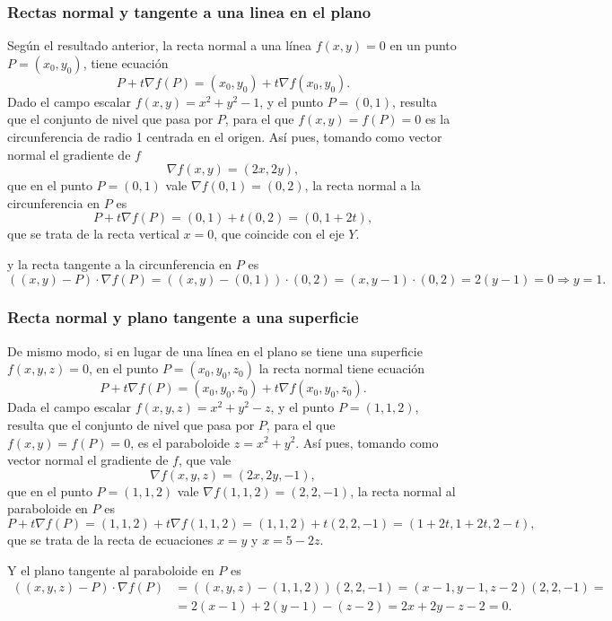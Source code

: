 \begin{frame}
	\frametitle{Rectas normal y tangente a una linea en el plano}
	Según el resultado anterior, la recta normal a una línea $f(x,y)=0$ en un punto $P=(x_0,y_0)$, tiene ecuación
	\[
		P+t\nabla f(P) = (x_0,y_0)+t\nabla f(x_0,y_0).
	\]
	Dado el campo escalar $f(x,y)=x^2+y^2-1$, y el punto $P=(0,1)$, resulta que el conjunto de nivel que pasa por $P$, para el que $f(x,y)=f(P)=0$ es la circunferencia de radio 1 centrada en el origen.
	Así pues, tomando como vector normal el gradiente de $f$
	\[
		\nabla f(x,y) = (2x,2y),
	\] 
	que en el punto $P=(0,1)$ vale $\nabla f(0,1) = (0,2)$, la recta normal a la circunferencia en $P$ es
	\[
		P+t\nabla f(P) = (0,1)+t(0,2) = (0,1+2t),
	\]
	que se trata de la recta vertical $x=0$, que coincide con el eje $Y$.
	
	y la recta tangente a la circunferencia en $P$ es
	\[
		((x,y)-P)\cdot \nabla f(P) = ((x,y)-(0,1))\cdot (0,2) = (x,y-1)\cdot(0,2) = 2(y-1) = 0 \Rightarrow y=1. 
	\]
\end{frame}


\begin{frame}
	\frametitle{Recta normal y plano tangente a una superficie}
	De mismo modo, si en lugar de una línea en el plano se tiene una superficie $f(x,y,z)=0$, en el punto $P=(x_0,y_0,z_0)$ la recta normal tiene ecuación
	\[
		P+t\nabla f(P) = (x_0,y_0,z_0)+t\nabla f(x_0,y_0,z_0).
	\]
	Dada el campo escalar $f(x,y,z)=x^2+y^2-z$, y el punto $P=(1,1,2)$, resulta que el conjunto de nivel que pasa por $P$, para el que $f(x,y)=f(P)=0$, es el paraboloide $z=x^2+y^2$.
	Así pues, tomando como vector normal el gradiente de $f$, que vale  
	\[
		\nabla f(x,y,z) = (2x,2y,-1),
	\] 
	que en el punto $P=(1,1,2)$ vale $\nabla f(1,1,2) = (2,2,-1)$, la recta normal al paraboloide en $P$ es
	\[
		P+t\nabla f(P) = (1,1,2)+t\nabla f(1,1,2) = (1,1,2)+t(2,2,-1) = (1+2t,1+2t,2-t),
	\]
	que se trata de la recta de ecuaciones  $x=y$ y $x=5-2z$.
	
	Y el plano tangente al paraboloide en $P$ es
	\begin{align*}
		((x,y,z)-P)\cdot \nabla f(P) & = ((x,y,z)-(1,1,2))(2,2,-1) = (x-1,y-1,z-2)(2,2,-1)= \\
		                             & = 2(x-1)+2(y-1)-(z-2) = 2x+2y-z-2= 0.                
	\end{align*}
\end{frame}


